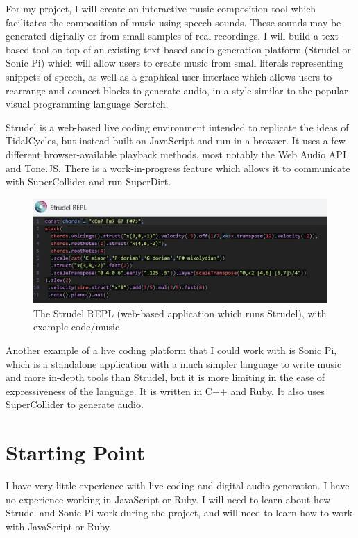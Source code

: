 \documentclass{article}
\begin{document}
For my project, I will create an interactive music composition tool which facilitates the composition of music using speech sounds. These sounds may be generated digitally or from small samples of real recordings. I will build a text-based tool on top of an existing text-based audio generation platform (Strudel or Sonic Pi) which will allow users to create music from small literals representing snippets of speech, as well as a graphical user interface which allows users to rearrange and connect blocks to generate audio, in a style similar to the popular visual programming language Scratch.

Strudel is a web-based live coding environment intended to replicate the ideas of TidalCycles, but instead built on JavaScript and run in a browser. It uses a few different browser-available playback methods, most notably the Web Audio API and Tone.JS. There is a work-in-progress feature which allows it to communicate with SuperCollider and run SuperDirt.
\begin{figure}[ht]
    \centering
    \includegraphics[scale=0.5]{images/strudel.png}
    \caption{The Strudel REPL (web-based application which runs Strudel), with example code/music}
    \label{fig:strudel}
\end{figure}

Another example of a live coding platform that I could work with is Sonic Pi, which is a standalone application with a much simpler language to write music and more in-depth tools than Strudel, but it is more limiting in the ease of expressiveness of the language. It is written in C++ and Ruby. It also uses SuperCollider to generate audio.
\section*{Starting Point}
I have very little experience with live coding and digital audio generation. I have no experience working in JavaScript or Ruby. I will need to learn about how Strudel and Sonic Pi work during the project, and will need to learn how to work with JavaScript or Ruby.
\end{document}
